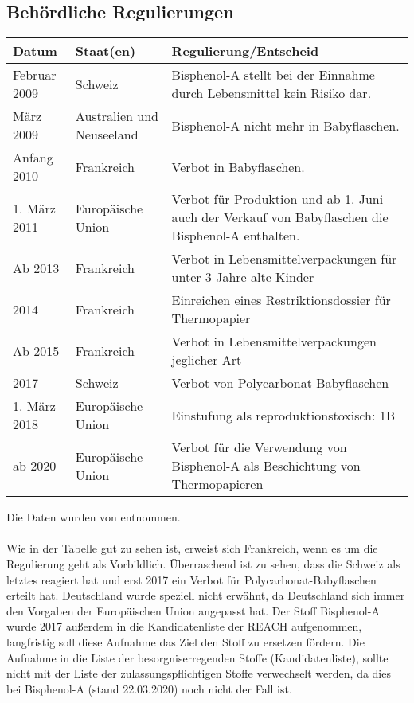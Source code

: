 \subsection{Behördliche Regulierungen}
\begin{tabular} [h]{l|l|p{9cm}}
Datum & Staat(en) & Regulierung/Entscheid\\
\hline
Februar 2009 & Schweiz & Bisphenol-A stellt bei der Einnahme durch Lebensmittel kein Risiko dar. \\
\hline
März 2009 & Australien und Neuseeland & Bisphenol-A nicht mehr in Babyflaschen. \\
\hline
Anfang 2010 & Frankreich & Verbot in Babyflaschen.\\
\hline
1. März 2011 & Europäische Union & Verbot für Produktion und ab 1. Juni auch der Verkauf von Babyflaschen die Bisphenol-A enthalten. \\
\hline
Ab 2013 & Frankreich & Verbot in Lebensmittelverpackungen für unter 3 Jahre alte Kinder \\
\hline
2014 & Frankreich & Einreichen eines Restriktionsdossier für Thermopapier \\
\hline
Ab 2015 & Frankreich & Verbot in Lebensmittelverpackungen jeglicher Art \\
\hline
2017 & Schweiz & Verbot von Polycarbonat-Babyflaschen\\
\hline
1. März 2018 & Europäische Union & Einstufung als reproduktionstoxisch: 1B \\
\hline
ab 2020 & Europäische Union & Verbot für die Verwendung von Bisphenol-A als Beschichtung von Thermopapieren\\
\end{tabular}
Die Daten wurden von \cite{Wikipedia} entnommen.\\
\\
Wie in der Tabelle gut zu sehen ist, erweist sich Frankreich, wenn es um die Regulierung geht als Vorbildlich. Überraschend ist zu sehen, dass die Schweiz als letztes reagiert hat und erst 2017 ein Verbot für Polycarbonat-Babyflaschen erteilt hat. Deutschland wurde speziell nicht erwähnt, da Deutschland sich immer den Vorgaben der Europäischen Union angepasst hat. Der Stoff Bisphenol-A wurde 2017 außerdem in die Kandidatenliste der REACH aufgenommen, langfristig soll diese Aufnahme das Ziel den Stoff zu ersetzen fördern. Die Aufnahme in die Liste der besorgniserregenden Stoffe (Kandidatenliste), sollte nicht mit der Liste der zulassungspflichtigen Stoffe verwechselt werden, da dies bei Bisphenol-A (stand 22.03.2020) noch nicht der Fall ist.


